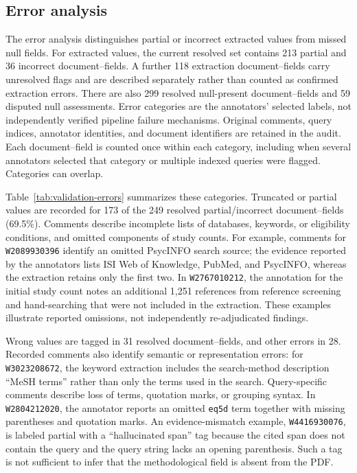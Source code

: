 

\subsection*{Error analysis}
The error analysis distinguishes partial or incorrect extracted values from missed null fields. For extracted values, the current resolved set contains 213 partial and 36 incorrect document--fields. A further 118 extraction document--fields carry unresolved flags and are described separately rather than counted as confirmed extraction errors. There are also 299 resolved null-present document--fields and 59 disputed null assessments. Error categories are the annotators' selected labels, not independently verified pipeline failure mechanisms. Original comments, query indices, annotator identities, and document identifiers are retained in the audit. Each document--field is counted once within each category, including when several annotators selected that category or multiple indexed queries were flagged. Categories can overlap.

Table~\ref{tab:validation-errors} summarizes these categories. Truncated or partial values are recorded for 173 of the 249 resolved partial/incorrect document--fields (69.5\%). Comments describe incomplete lists of databases, keywords, or eligibility conditions, and omitted components of study counts. For example, comments for \texttt{W2089930396} identify an omitted PsycINFO search source; the evidence reported by the annotators lists ISI Web of Knowledge, PubMed, and PsycINFO, whereas the extraction retains only the first two. In \texttt{W2767010212}, the annotation for the initial study count notes an additional 1,251 references from reference screening and hand-searching that were not included in the extraction. These examples illustrate reported omissions, not independently re-adjudicated findings.

Wrong values are tagged in 31 resolved document--fields, and other errors in 28. Recorded comments also identify semantic or representation errors: for \texttt{W3023208672}, the keyword extraction includes the search-method description ``MeSH terms'' rather than only the terms used in the search. Query-specific comments describe loss of terms, quotation marks, or grouping syntax. In \texttt{W2804212020}, the annotator reports an omitted \texttt{eq5d} term together with missing parentheses and quotation marks. An evidence-mismatch example, \texttt{W4416930076}, is labeled partial with a ``hallucinated span'' tag because the cited span does not contain the query and the query string lacks an opening parenthesis. Such a tag is not sufficient to infer that the methodological field is absent from the PDF.

